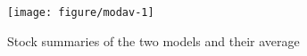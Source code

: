 \documentclass[a4paper,english,10pt]{article}\usepackage[]{graphicx}\usepackage[]{color}
\makeatletter
\def\maxwidth{ %
  \ifdim\Gin@nat@width>\linewidth
    \linewidth
  \else
    \Gin@nat@width
  \fi
}
\newenvironment{knitrout}{}{} %
\makeatother
\begin{document}
\begin{knitrout}
\color{fgcolor}\begin{figure}[H]

{\centering \texttt{[image: figure/modav-1]} 

}

\caption[Stock summaries of the two models and their average]{Stock summaries of the two models and their average\label{fig:modav}}
\end{figure}


\end{knitrout}
\end{document}
